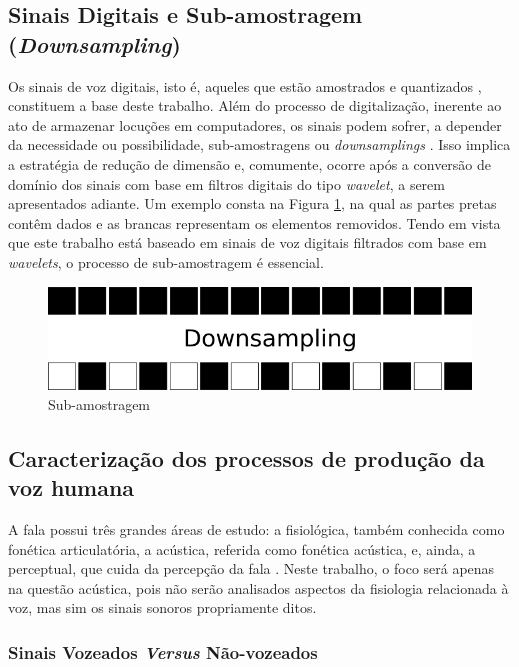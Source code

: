 		\subsection{Sinais Digitais e Sub-amostragem  (\textit{Downsampling})}
			\par Os sinais de voz digitais, isto é, aqueles que estão amostrados e quantizados \cite{haykin2011sistemas}, constituem a base deste trabalho. Além do processo de digitalização, inerente ao ato de armazenar locuções em computadores, os sinais podem sofrer, a depender da necessidade ou possibilidade, sub-amostragens ou \textit{downsamplings} \cite{robi2003}. Isso implica a estratégia de redução de dimensão e, comumente, ocorre após a conversão de domínio dos sinais com base em filtros digitais do tipo \textit{wavelet}, a serem apresentados adiante. Um exemplo consta na Figura \ref{fig:downsampling}, na qual as partes pretas contêm dados e as brancas representam os elementos removidos. Tendo em vista que este trabalho está baseado em sinais de voz digitais filtrados com base em \textit{wavelets}, o processo de sub-amostragem é essencial. 
			\begin{figure}[h]
				\centering
				\includegraphics[width=0.7\linewidth]{images/downsampling}
				\caption{Sub-amostragem}
				\label{fig:downsampling}
			\end{figure}
			
		\subsection{Caracterização dos processos de produção da voz humana}
			\par A fala possui três grandes áreas de estudo: a fisiológica, também conhecida como fonética articulatória, a acústica, referida como fonética acústica, e, ainda, a perceptual, que cuida da percepção  da  fala \cite{kremer2014eficiencia}. Neste trabalho, o foco será apenas na questão acústica, pois não serão analisados aspectos da fisiologia relacionada à voz, mas sim os sinais sonoros propriamente ditos.
			
			\subsubsection{Sinais Vozeados \textit{Versus} Não-vozeados}

